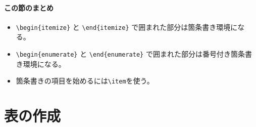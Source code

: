 \paragraph{この節のまとめ}

\begin{itemize}
\item \verb|\begin{itemize}| と \verb|\end{itemize}| で囲まれた部分は箇条書き環境になる。
\item \verb|\begin{enumerate}| と \verb|\end{enumerate}| で囲まれた部分は番号付き箇条書き環境になる。
\item 箇条書きの項目を始めるには\verb|\item|を使う。
\end{itemize}

\section{表の作成}
\label{sec:latex:table}

